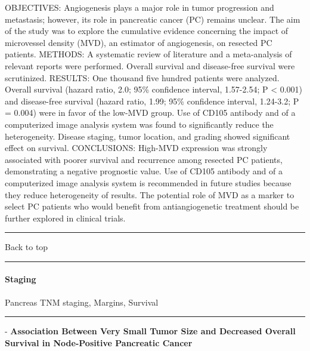 \documentclass[]{article}
\let\oldparagraph\paragraph
\renewcommand{\paragraph}[1]{\oldparagraph{#1}\mbox{}}
\begin{document}
OBJECTIVES: Angiogenesis plays a major role in tumor progression and
metastasis; however, its role in pancreatic cancer (PC) remains unclear.
The aim of the study was to explore the cumulative evidence concerning
the impact of microvessel density (MVD), an estimator of angiogenesis,
on resected PC patients. METHODS: A systematic review of literature and
a meta-analysis of relevant reports were performed. Overall survival and
disease-free survival were scrutinized. RESULTS: One thousand five
hundred patients were analyzed. Overall survival (hazard ratio, 2.0;
95\% confidence interval, 1.57-2.54; P \textless{} 0.001) and
disease-free survival (hazard ratio, 1.99; 95\% confidence interval,
1.24-3.2; P = 0.004) were in favor of the low-MVD group. Use of CD105
antibody and of a computerized image analysis system was found to
significantly reduce the heterogeneity. Disease staging, tumor location,
and grading showed significant effect on survival. CONCLUSIONS: High-MVD
expression was strongly associated with poorer survival and recurrence
among resected PC patients, demonstrating a negative prognostic value.
Use of CD105 antibody and of a computerized image analysis system is
recommended in future studies because they reduce heterogeneity of
results. The potential role of MVD as a marker to select PC patients who
would benefit from antiangiogenetic treatment should be further explored
in clinical trials.

{}

{}

\begin{center}\rule{0.5\linewidth}{\linethickness}\end{center}

Back to top

\begin{center}\rule{0.5\linewidth}{\linethickness}\end{center}

\pagebreak

\hypertarget{staging}{%
\paragraph{Staging}\label{staging}}

Pancreas TNM staging, Margins, Survival

\begin{center}\rule{0.5\linewidth}{\linethickness}\end{center}

 - \textbf{Association Between Very Small Tumor Size and Decreased
Overall Survival in Node-Positive Pancreatic Cancer}
\end{document}
